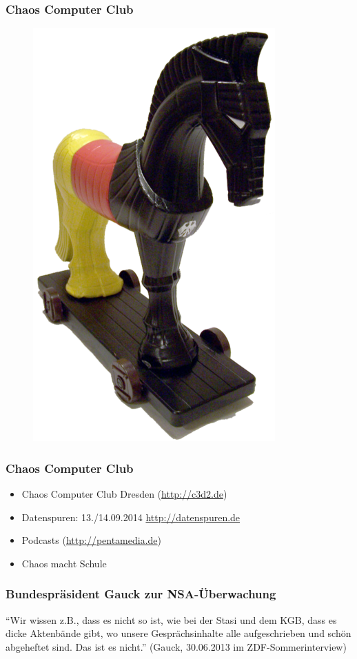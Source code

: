 \documentclass[12pt]{beamer}
\begin{document}
\begin{frame}
  \frametitle{Chaos Computer Club}
  \begin{figure}
    \includegraphics[height=0.7\textheight]{img/trojaner.png}
  \end{figure}
\end{frame}

\begin{frame}
    \frametitle{Chaos Computer Club}
    \begin{itemize}
      \item<1-> Chaos Computer Club Dresden (\url{http://c3d2.de})
          \note{}
      \item<2-> Datenspuren: 13./14.09.2014 \url{http://datenspuren.de}
      \item<3-> Podcasts (\url{http://pentamedia.de})
      \item<4-> Chaos macht Schule
    \end{itemize}
\end{frame}

\begin{frame}
    \frametitle{Bundespräsident Gauck zur NSA-Überwachung}
    \begin{center}
      ``Wir wissen z.B., dass es nicht so ist, wie bei der Stasi und dem KGB, dass es dicke Aktenbände gibt, wo unsere Gesprächsinhalte alle aufgeschrieben und schön abgeheftet sind. Das ist es nicht.''
      (Gauck, 30.06.2013 im ZDF-Sommerinterview)
    \end{center}
\end{frame}
\end{document}
